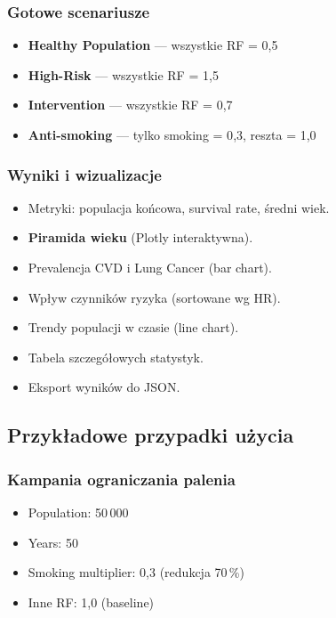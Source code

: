 \documentclass[11pt,a4paper]{article}
\begin{document}
\subsubsection{Gotowe scenariusze}

\begin{itemize}[leftmargin=*]
  \item \textbf{Healthy Population} --- wszystkie RF = 0{,}5
  \item \textbf{High-Risk} --- wszystkie RF = 1{,}5
  \item \textbf{Intervention} --- wszystkie RF = 0{,}7
  \item \textbf{Anti-smoking} --- tylko smoking = 0{,}3, reszta = 1{,}0
\end{itemize}

\subsubsection{Wyniki i wizualizacje}

\begin{itemize}[leftmargin=*]
  \item Metryki: populacja końcowa, survival rate, średni wiek.
  \item \textbf{Piramida wieku} (Plotly interaktywna).
  \item Prevalencja CVD i Lung Cancer (bar chart).
  \item Wpływ czynników ryzyka (sortowane wg HR).
  \item Trendy populacji w czasie (line chart).
  \item Tabela szczegółowych statystyk.
  \item Eksport wyników do JSON.
\end{itemize}

\subsection{Przykładowe przypadki użycia}

\subsubsection{Kampania ograniczania palenia}

\begin{itemize}
  \item Population: 50\,000
  \item Years: 50
  \item Smoking multiplier: 0{,}3 (redukcja 70\,\%)
  \item Inne RF: 1{,}0 (baseline)
\end{itemize}
\end{document}
